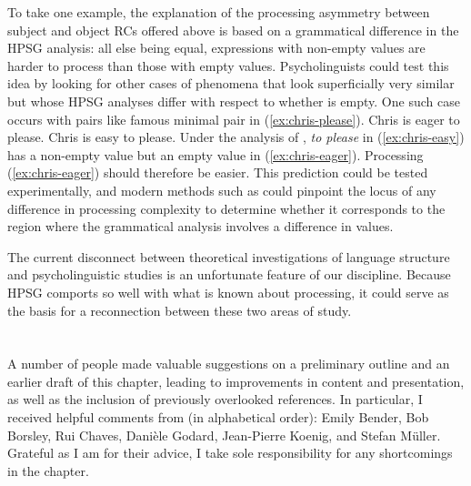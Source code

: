 \documentclass[output=paper
 	        ,biblatex
                ,babelshorthands
                ,newtxmath
                ,draftmode
                ,colorlinks, citecolor=brown
]{langscibook}
\begin{document}
To take one example, the explanation of the processing asymmetry between subject and object RCs
offered above is based on a grammatical difference in the HPSG analysis:  all else being equal,
expressions with non-empty \slasch{} values are harder to process than those with empty \slasch
values.  Psycholinguists could test this idea by looking for other cases of phenomena that look
superficially very similar but whose HPSG analyses differ with respect to whether \slasch is empty.
One such case occurs with pairs like  famous minimal pair in
(\ref{ex:chris-please}). 
\eal\label{ex:chris-please}
\ex Chris is eager to please.\label{ex:chris-eager}
\ex Chris is easy to please.\label{ex:chris-easy}
\zl
Under the analysis of \citet[Section~4.3]{ps2}, \emph{to please} in (\ref{ex:chris-easy}) has a non-empty
\slasch{} value but an empty \slasch value in (\ref{ex:chris-eager}).  Processing
(\ref{ex:chris-eager}) should therefore be easier.  This prediction could be tested experimentally,
and modern methods such as  could pinpoint the locus of any difference in
processing complexity to determine whether it corresponds to the region where the grammatical
analysis involves a difference in \slasch{} values. 

The current disconnect between theoretical investigations of language structure and psycholinguistic
studies is an unfortunate feature of our discipline.  Because HPSG comports so well with what is
known about processing, it could serve as the basis for a reconnection between these two areas of
study. 

\section*{\acknowledgmentsUS}

A number of people made valuable suggestions on a preliminary outline and an earlier draft of this
chapter, leading to improvements in content and presentation, as well as the inclusion of previously
overlooked references.  In particular, I received helpful comments from (in alphabetical order):
Emily Bender, Bob Borsley, Rui Chaves, Danièle Godard, Jean-Pierre Koenig, and Stefan Müller.
Grateful as I am for their advice, I take sole responsibility for any shortcomings in the chapter. 

{\sloppy
\printbibliography[heading=subbibliography,notkeyword=this] 
}
\end{document}

